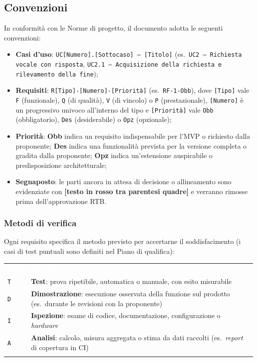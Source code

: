 \documentclass[12pt,a4paper]{article}
\newcommand{\ph}[1]{\textcolor{bfph}{\textbf{[#1]}}}
\newcommand{\tightlist}{\setlength{\itemsep}{1pt}\setlength{\parskip}{0pt}}
\newcommand{\thc}[1]{\textcolor{white}{\textbf{#1}}}
\newcommand{\rl}{\\ \arrayrulecolor{bfline}\hline}
\begin{document}
\subsection{Convenzioni}
In conformità con le Norme di progetto, il documento adotta le seguenti convenzioni:
\begin{itemize}
\tightlist
\item \textbf{Casi d'uso}: \texttt{UC[Numero].[Sottocaso] -- [Titolo]} (es.\ \texttt{UC2 -- Richiesta vocale con risposta}, \texttt{UC2.1 -- Acquisizione della richiesta e rilevamento della fine});
\item \textbf{Requisiti}: \texttt{R[Tipo]-[Numero]-[Priorità]} (es.\ \texttt{RF-1-Obb}), dove \texttt{[Tipo]} vale \texttt{F} (funzionale), \texttt{Q} (di qualità), \texttt{V} (di vincolo) o \texttt{P} (prestazionale), \texttt{[Numero]} è un progressivo univoco all'interno del tipo e \texttt{[Priorità]} vale \texttt{Obb} (obbligatorio), \texttt{Des} (desiderabile) o \texttt{Opz} (opzionale);
\item \textbf{Priorità}: \textbf{Obb} indica un requisito indispensabile per l'MVP o richiesto dalla proponente; \textbf{Des} indica una funzionalità prevista per la versione completa o gradita dalla proponente; \textbf{Opz} indica un'estensione auspicabile o predisposizione architetturale;
\item \textbf{Segnaposto}: le parti ancora in attesa di decisione o allineamento sono evidenziate con \ph{testo in rosso tra parentesi quadre} e verranno rimosse prima dell'approvazione RTB.
\end{itemize}
 
\subsubsection{Metodi di verifica}
Ogni requisito specifica il metodo previsto per accertarne il soddisfacimento (i casi di test puntuali sono definiti nel Piano di qualifica):
 
\begin{center}
\begin{tabularx}{\linewidth}{>{\centering\arraybackslash}p{1.6cm}X}
\rowcolor{bfblue}\thc{Sigla} & \thc{Metodo} \\
\texttt{T} & \textbf{Test}: prova ripetibile, automatica o manuale, con esito misurabile \rl
\texttt{D} & \textbf{Dimostrazione}: esecuzione osservata della funzione sul prodotto (es.\ durante le revisioni con la proponente) \rl
\texttt{I} & \textbf{Ispezione}: esame di codice, documentazione, configurazione o \emph{hardware} \rl
\texttt{A} & \textbf{Analisi}: calcolo, misura aggregata o stima da dati raccolti (es.\ \emph{report} di copertura in CI) \rl
\end{tabularx}
\end{center}
 
\end{document}
